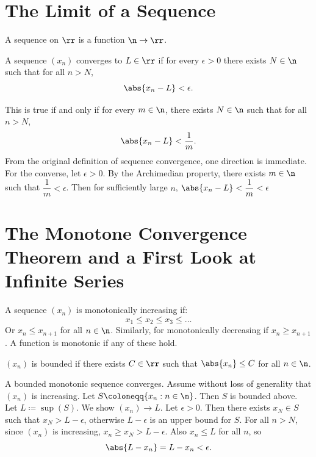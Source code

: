 
\section{The Limit of a Sequence}

\begin{definition}[Sequence]
    A sequence on $\rr$ is a function $\n\to\rr$.
\end{definition}

\begin{definition}
    A sequence $(x_n)$ converges to $L\in\rr$ if for every $\epsilon >0$ there exists $N\in\n$ such that for all $n > N$,
    \[
        \abs{x_n - L} < \epsilon.
    \]
\end{definition}

\begin{corollary}{
    This is true if and only if for every $m\in\n$, there exists $N\in\n$ such that for all $n > N$,
    \[
        \abs{x_n- L} < \dfrac{1}{m}.
    \]
}
    From the original definition of sequence convergence, one direction is immediate.
    For the converse, let $\epsilon > 0$.
    By the Archimedian property, there exists $m\in\n$ such that $\dfrac{1}{m} < \epsilon$.
    Then for sufficiently large $n$, $\abs{x_n - L} < \dfrac{1}{m} < \epsilon$
\end{corollary}

\setcounter{section}{2}
\section{The Monotone Convergence Theorem and a First Look at Infinite Series}

\begin{definition}
    A sequence $(x_n)$ is monotonically increasing if:
    \[
        x_1\leq x_2\leq x_3\leq \ldots
    \]
    Or $x_n\leq x_{n+1}$ for all $n\in\n$.
    Similarly, for monotonically decreasing if $x_n\geq x_{n+1}$.
    A function is monotonic if any of these hold.
\end{definition}

\begin{definition}[Bounded]
    $(x_n)$ is bounded if there exists $C\in\rr$ such that $\abs{x_n}\leq C$ for all $n\in\n$.
\end{definition}

\begin{theorem}{
    A bounded monotonic sequence converges.
}
    Assume without loss of generality that $(x_n)$ is increasing.
    Let $S\coloneqq\{x_n : n\in\n\}$.
    Then $S$ is bounded above.
    Let $L\coloneqq\sup(S)$.
    We show $(x_n)\to L$.
    Let $\epsilon > 0$.
    Then there exists $x_N\in S$ such that $x_N > L - \epsilon$, otherwise $L-\epsilon$ is an upper bound for $S$.
    For all $n > N$, since $(x_n)$ is increasing, $x_n\geq x_N > L - \epsilon$.
    Also $x_n\leq L$ for all $n$, so
    \[
        \abs{L - x_n} = L - x_n < \epsilon.
    \]
\end{theorem}

